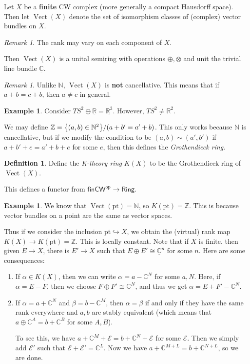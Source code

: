 \documentclass[leqno, openany]{memoir}
\theoremstyle{definition}
\newtheorem{defn}[thm]{Definition}
\newtheorem{exm}[thm]{Example}
\theoremstyle{remark}
\newtheorem{rmk}[thm]{Remark}
\theoremstyle{plain}
\theoremstyle{definition}
\theoremstyle{remark}
\newcommand{\N}{\mathbb{N}}
\newcommand{\R}{\mathbb{R}}
\newcommand{\C}{\mathbb{C}}
\newcommand{\Z}{\mathbb{Z}}
\newcommand{\mc}[1]{\mathcal{#1}}
\newcommand{\mr}[1]{\mathrm{#1}}
\newcommand{\ms}[1]{\mathsf{#1}}
\newcommand{\ul}[1]{\underline{#1}}
\DeclareMathOperator{\Vect}{Vect}
\begin{document}
Let $X$ be a \textbf{finite} CW complex (more generally a compact Hausdorff space). Then let $\Vect(X)$ denote the set of isomorphism classes of (complex) vector bundles on $X$.

\begin{rmk}
    The rank may vary on each component of $X$.
\end{rmk}

Then $\Vect(X)$ is a unital semiring with operations $\oplus, \otimes$ and unit the trivial line bundle $\underline{\C}$.

\begin{rmk}
    Unlike $\N$, $\Vect(X)$ is \textbf{not} cancellative. This means that if $a+b = c+b$, then $a \neq c$ in general. 
\end{rmk}

\begin{exm}
    Consider $TS^2 \oplus \ul{\R} = \ul{\R^3}$. However, $TS^2 \neq \R^2$.
\end{exm}

We may define $\Z = \qty{(a,b) \in \N^2} / (a+b' = a'+b)$. This only works because $\N$ is cancellative, but if we modify the condition to be $(a,b) \sim (a',b')$ if $a+b'+e = a'+b+e$ for some $e$, then this defines the \textit{Grothendieck ring}.

\begin{defn}
    Define the \textit{K-theory ring} $K(X)$ to be the Grothendieck ring of $\Vect(X)$.  
\end{defn}

This defines a functor from $\ms{finCW}^{\mr{op}} \to \ms{Ring}$.

\begin{exm}
    We know that $\Vect(\mr{pt}) = \N$, so $K(\mr{pt}) = \Z$. This is because vector bundles on a point are the same as vector spaces.
\end{exm}

Thus if we consider the inclusion $\mr{pt} \hookrightarrow X$, we obtain the (virtual) rank map $K(X) \to K(\mr{pt}) = \Z$. This is locally constant. Note that if $X$ is finite, then given $E \to X$, there is $E' \to X$ such that $E \oplus E' \cong \ul{\C}^n$ for some $n$. Here are some consequences:
\begin{enumerate}
    \item If $\alpha \in K(X)$, then we can write $\alpha = a - \C^N$ for some $a, N$. Here, if $\alpha = E-F$, then we choose $F \oplus F' \cong \C^N$, and thus we get $\alpha = E + F' - \C^N$.
    \item If $\alpha = a + \C^N$ and $\beta = b - \C^M$, then $\alpha = \beta$ if and only if they have the same rank everywhere and $a,b$ are stably equivalent (which means that $a \oplus \C^A = b + \C^B$ for some $A,B$).

        To see this, we have $a + \C^M + \mc{E} = b + \C^N + \mc{E}$ for some $\mc{E}$. Then we simply add $\mc{E}'$ such that $\mc{E} + \mc{E}' = \C^L$. Now we have $a + \C^{M+L} = b + \C^{N+L}$, so we are done.
\end{enumerate}
\end{document}
